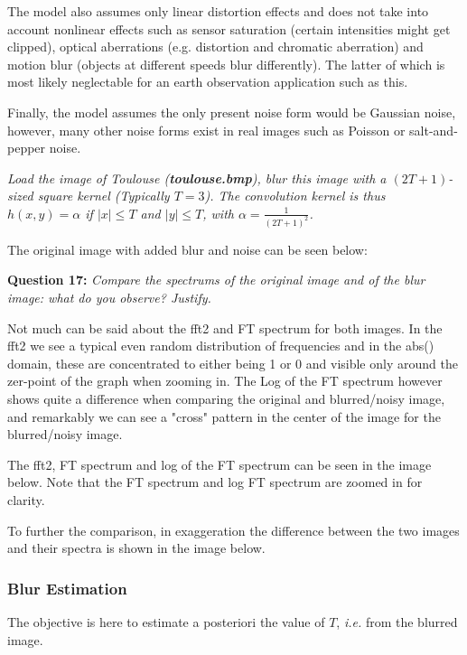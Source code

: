The model also assumes only linear distortion effects and does not take into account nonlinear effects such as sensor saturation (certain intensities might get clipped), optical aberrations (e.g. distortion and chromatic aberration) and motion blur (objects at different speeds blur differently). The latter of which is most likely neglectable for an earth observation application such as this.

Finally, the model assumes the only present noise form would be Gaussian noise, however, many other noise forms exist in real images such as Poisson or salt-and-pepper noise.

\textit{Load the image of Toulouse (\textbf{toulouse.bmp}), blur this image with a $(2T+1)$-sized square kernel (Typically $T = 3$). The convolution kernel is thus $h(x,y) = \alpha$ if $|x| \leq T$ and $|y| \leq T$, with $\alpha = \frac{1}{(2T+1)^2}$.
}

The original image with added blur and noise can be seen below:


\textbf{Question 17:}
\textit{Compare the spectrums of the original image and of the blur image: what do you observe? Justify.}

Not much can be said about the fft2 and FT spectrum for both images. In the fft2 we see a typical even random distribution of frequencies and in the abs() domain, these are concentrated to either being 1 or 0 and visible only around the zer-point of the graph when zooming in. The Log of the FT spectrum however shows quite a difference when comparing the original and blurred/noisy image, and remarkably we can see a "cross" pattern in the center of the image for the blurred/noisy image.

The fft2, FT spectrum and log of the FT spectrum can be seen in the image below.
Note that the FT spectrum and log FT spectrum are zoomed in for clarity.

To further the comparison, in exaggeration the difference between the two images and their spectra is shown in the image below.




\subsubsection{Blur Estimation}
The objective is here to estimate a posteriori the value of $T$, \textit{i.e.} from the blurred image.

